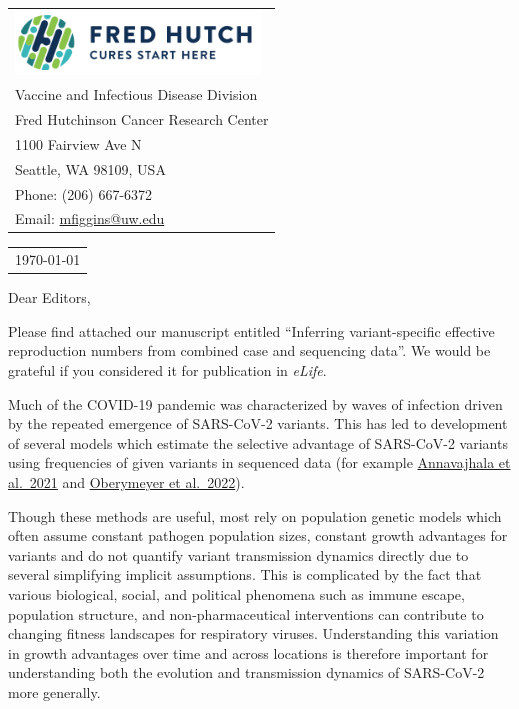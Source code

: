 \documentclass[11pt]{article}
\begin{document}
\thispagestyle{empty} %

\mbox{}\hfill
\begin{tabular}{l @{}}
	\includegraphics[width=6.5cm]{figures/fhcrc_logo} \\
	Vaccine and Infectious Disease Division \\
	Fred Hutchinson Cancer Research Center \\
	1100 Fairview Ave N \\
	Seattle, WA 98109, USA \\
	Phone: (206) 667-6372 \\
	Email: \href{mailto:mfiggins@uw.edu}{mfiggins@uw.edu} \\
\end{tabular}

\vspace{0.1in} %

\begin{tabular}{@{} l}
  \today
\end{tabular}

\vspace{0.1in} %

Dear Editors,

\medskip %

Please find attached our manuscript entitled ``Inferring variant-specific effective reproduction numbers from combined case and sequencing data''.
We would be grateful if you considered it for publication in \textit{eLife}.

Much of the COVID-19 pandemic was characterized by waves of infection driven by the repeated emergence of SARS-CoV-2 variants.
This has led to development of several models which estimate the selective advantage of SARS-CoV-2 variants using frequencies of given variants in sequenced data (for example \href{https://www.nature.com/articles/s41586-021-03908-2}{Annavajhala et al.\ 2021} and \href{https://www.science.org/doi/10.1126/science.abm1208}{Oberymeyer et al.\ 2022}).

Though these methods are useful, most rely on population genetic models which often assume constant pathogen population sizes, constant growth advantages for variants and do not quantify variant transmission dynamics directly due to several simplifying implicit assumptions.
This is complicated by the fact that various biological, social, and political phenomena such as immune escape, population structure, and non-pharmaceutical interventions can contribute to changing fitness landscapes for respiratory viruses.
Understanding this variation in growth advantages over time and across locations is therefore important for understanding both the evolution and transmission dynamics of SARS-CoV-2 more generally.
\end{document}
